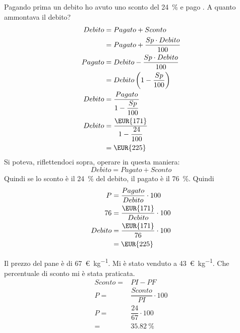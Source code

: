 \begin{exercise}
	Pagando prima un debito ho avuto uno sconto del  \SI{24}{\percent} e pago . A quanto ammontava il debito?
	\tcblower
	\begin{align*}
	Debito={}&Pagato+Sconto\\
	={}&Pagato+\dfrac{Sp\cdot Debito}{100}\\
	Pagato={}&Debito-\dfrac{Sp\cdot Debito}{100}\\
	={}&Debito\left(1-\dfrac{Sp}{100}\right)\\
	Debito={}&\dfrac{Pagato}{1-\dfrac{Sp}{100}}\\
	Debito={}&\dfrac{\mbox{\EUR{171}}}{1-\dfrac{24}{100}}\\
	={}&\mbox{\EUR{225}}
	\end{align*}
Si poteva, riflettendoci sopra, operare in questa maniera:
\[Debito=Pagato+Sconto\]
Quindi se lo sconto è il \SI{24}{\percent} del debito, il pagato è il \SI{76}{\percent}. Quindi
\begin{align*}
	P={}&\dfrac{Pagato}{Debito}\cdot100\\
	76={}&\dfrac{\mbox{\EUR{171}}}{Debito}\cdot 100\\
	Debito={}&\dfrac{\mbox{\EUR{171}}}{76}\cdot 100\\
	={}&\mbox{\EUR{225}}
\end{align*} 
\end{exercise}
\begin{exercise}
Il prezzo del pane è di \SI{67}{\euro\per\kg}. Mi è stato venduto a \SI{43}{\euro\per\kg}. Che percentuale di sconto mi è stata praticata.
	\tcblower
	\begin{align*}
		Sconto={}&PI-PF\\
		P={}&\dfrac{Sconto}{PI}\cdot 100\\
		P={}&\dfrac{24}{67}\cdot 100\\
		={}&\SI{35.82}{\percent}
	\end{align*}
\end{exercise}

